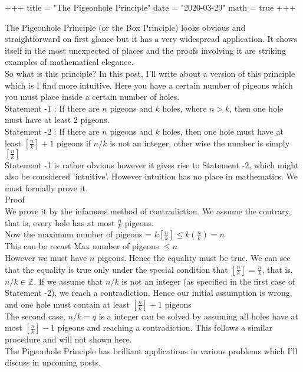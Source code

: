 +++
title = "The Pigeonhole Principle"
date = "2020-03-29"
math = true
+++
 
The Pigeonhole Principle (or the Box Principle) looks obvious and straightforward on first glance but it has a very widespread application. It shows itself in the most unexpected of places and the proofs involving it are striking examples of mathematical elegance. \\
So what is this principle? In this post, I'll write about a version of this principle which is I find more intuitive. Here you have a certain number of pigeons which you must place inside a certain number of holes.  \\

Statement -1 : If there are $n$ pigeons and $k$ holes, where $n>k$, then one hole must have at least 2 pigeons. \\

Statement -2 : If there are $n$ pigeons and $k$ holes, then one hole must have at least $[\frac{n}{k}]+1$ pigeons if $n/k$ is not an integer, other wise the number is simply $[\frac{n}{k}]$ \\

Statement -1 is rather obvious however it gives rise to Statement -2, which might also be considered 'intuitive'. However intuition has no place in mathematics. We must formally prove it. \\

Proof \\

We prove it by the infamous method of contradiction. We assume the contrary, that is, every hole has at most $\frac{n}{k}$ pigeons. \\

Now the maximum number of pigeons = $k[\frac{n}{k}] \leq k(\frac{n}{k}) = n$ \\
This can be recast Max number of pigeons $\leq n$ \\

However we must have $n$ pigeons. Hence the equality must be true. We can see that the equality is true only under the special condition that  $[\frac{n}{k}] = \frac{n}{k}$, that is, $n/k \in \mathbb{Z}$.  If we assume that $n/k$ is not an integer (as specified in the first case of Statement -2), we reach a contradiction. Hence our initial assumption is wrong, and one hole must contain at least $[\frac{n}{k}]+1$ pigeons \\

The second case, $n/k = q$ is a integer can be solved by assuming all holes have at most $[\frac{n}{k}] -1$ pigeons and reaching a contradiction. This follows a similar procedure and will not shown here. \\

The Pigeonhole Principle has brilliant applications in various problems which I'll discuss in upcoming posts.


